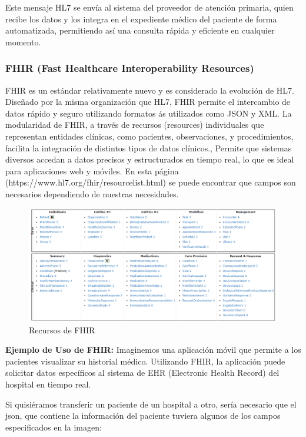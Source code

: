 \documentclass[12pt, a4paper, twoside]{article}
\begin{document}
	Este mensaje HL7 se envía al sistema del proveedor de atención primaria, quien recibe los datos y los integra en el expediente médico del paciente de forma automatizada, permitiendo así una consulta rápida y eficiente en cualquier momento.
	
	
	\subsubsection{FHIR (Fast Healthcare Interoperability Resources)} 
	
	FHIR es un estándar relativamente nuevo y es considerado la evolución de HL7. Diseñado por la misma organización que HL7, FHIR permite el intercambio de datos rápido y seguro utilizando formatos ás utilizados como JSON y XML. La modularidad de FHIR, a través de recursos (resources) individuales que representan entidades clínicas, como pacientes, observaciones, y procedimientos, facilita la integración de distintos tipos de datos clínicos., Permite que sistemas diversos accedan a datos precisos y estructurados en tiempo real, lo que es ideal para aplicaciones web y móviles.
	En esta página (https://www.hl7.org/fhir/resourcelist.html) se puede encontrar que campos son necesarios dependiendo de nuestras necesidades. 
	
	\begin{figure}[h!]
		\includegraphics[width=1\textwidth]{image/1.png}
		\caption{Recursos de FHIR}
		\label{fig:1}
	\end{figure}
	\vspace{9cm}
	
	\textbf{Ejemplo de Uso de FHIR:} Imaginemos una aplicación móvil que permite a los pacientes visualizar su historial médico. Utilizando FHIR, la aplicación puede solicitar datos específicos al sistema de EHR (Electronic Health Record) del hospital en tiempo real.
	
	Si quisiéramos transferir un paciente de un hospital a otro, sería necesario que el json, que contiene la información del paciente tuviera algunos de los campos especificados en la imagen:
	\vspace{1cm}
	
\end{document}
